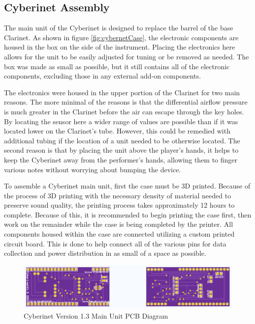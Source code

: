 \subsection{Cyberinet Assembly}

The main unit of the Cyberinet is designed to replace the barrel of the base Clarinet. As shown in figure \ref{fig:cybernetCase}, the electronic components are housed in the box on the side of the instrument. Placing the electronics here allows for the unit to be easily adjusted for tuning or be removed as needed. The box was made as small as possible, but it still contains all of the electronic components, excluding those in any external add-on components. 

The electronics were housed in the upper portion of the Clarinet for two main reasons. The more minimal of the reasons is that the differential airflow pressure is much greater in the Clarinet before the air can escape through the key holes. By locating the sensor here a wider range of values are possible than if it was located lower on the Clarinet's tube. However, this could be remedied with additional tubing if the location of a unit needed to be otherwise located. The second reason is that by placing the unit above the player's hands, it helps to keep the Cyberinet away from the performer's hands, allowing them to finger various notes without worrying about bumping the device.

To assemble a Cyberinet main unit, first the case must be 3D printed. Because of the process of 3D printing with the necessary density of material needed to preserve sound quality, the printing process takes approximately 12 hours to complete. Because of this, it is recommended to begin printing the case first, then work on the remainder while the case is being completed by the printer. All components housed within the case are connected utilizing a custom printed circuit board. This is done to help connect all of the various pins for data collection and power distribution in as small of a space as possible. 

\begin{center}
    \begin{figure}
        \centering
        \includegraphics[scale=0.6]{diagrams/PCBs/CyberinetPCB.png}
        \caption{Cyberinet Version 1.3  Main Unit PCB Diagram}
        \label{fig:mainUnitPCB}
    \end{figure}
\end{center}

